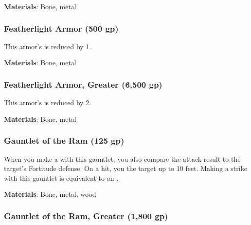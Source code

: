 \vspace{0.25em}
\textbf{Materials}: Bone, metal


\lowercase{\hypertarget{item:Featherlight Armor}{}}\label{item:Featherlight Armor}
\hypertarget{item:Featherlight Armor}{\subsubsection{Featherlight Armor\hfill{} (500 gp)}}

This armor's  is reduced by 1.



\vspace{0.25em}
\textbf{Materials}: Bone, metal


\lowercase{\hypertarget{item:Featherlight Armor, Greater}{}}\label{item:Featherlight Armor, Greater}
\hypertarget{item:Featherlight Armor, Greater}{\subsubsection{Featherlight Armor, Greater\hfill{} (6,500 gp)}}

This armor's  is reduced by 2.



\vspace{0.25em}
\textbf{Materials}: Bone, metal


\lowercase{\hypertarget{item:Gauntlet of the Ram}{}}\label{item:Gauntlet of the Ram}
\hypertarget{item:Gauntlet of the Ram}{\subsubsection{Gauntlet of the Ram\hfill{} (125 gp)}}

When you make a  with this gauntlet, you also compare the attack result to the target's Fortitude defense.
On a hit, you  the target up to 10 feet.
Making a strike with this gauntlet is equivalent to an .



\vspace{0.25em}
\textbf{Materials}: Bone, metal, wood


\lowercase{\hypertarget{item:Gauntlet of the Ram, Greater}{}}\label{item:Gauntlet of the Ram, Greater}
\hypertarget{item:Gauntlet of the Ram, Greater}{\subsubsection{Gauntlet of the Ram, Greater\hfill{} (1,800 gp)}}

